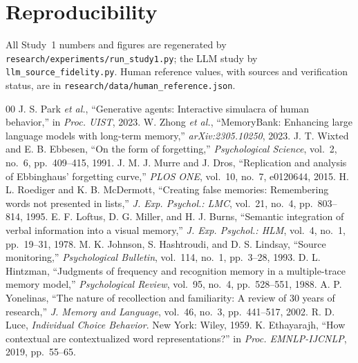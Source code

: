 \documentclass[conference]{IEEEtran}
\begin{document}
\section*{Reproducibility}
All Study~1 numbers and figures are regenerated by
\texttt{research/experiments/run\_study1.py}; the LLM study by
\texttt{llm\_source\_fidelity.py}. Human reference values, with sources and
verification status, are in \texttt{research/data/human\_reference.json}.

\begin{thebibliography}{00}
 J. S. Park \emph{et al.}, ``Generative agents: Interactive
simulacra of human behavior,'' in \emph{Proc. UIST}, 2023.
 W. Zhong \emph{et al.}, ``MemoryBank: Enhancing large language
models with long-term memory,'' \emph{arXiv:2305.10250}, 2023.
 J. T. Wixted and E. B. Ebbesen, ``On the form of forgetting,''
\emph{Psychological Science}, vol.~2, no.~6, pp.~409--415, 1991.
 J. M. J. Murre and J. Dros, ``Replication and analysis of
Ebbinghaus' forgetting curve,'' \emph{PLOS ONE}, vol.~10, no.~7, e0120644, 2015.
 H. L. Roediger and K. B. McDermott, ``Creating false
memories: Remembering words not presented in lists,'' \emph{J. Exp. Psychol.: LMC},
vol.~21, no.~4, pp.~803--814, 1995.
 E. F. Loftus, D. G. Miller, and H. J. Burns, ``Semantic
integration of verbal information into a visual memory,'' \emph{J. Exp. Psychol.:
HLM}, vol.~4, no.~1, pp.~19--31, 1978.
 M. K. Johnson, S. Hashtroudi, and D. S. Lindsay, ``Source
monitoring,'' \emph{Psychological Bulletin}, vol.~114, no.~1, pp.~3--28, 1993.
 D. L. Hintzman, ``Judgments of frequency and recognition
memory in a multiple-trace memory model,'' \emph{Psychological Review}, vol.~95,
no.~4, pp.~528--551, 1988.
 A. P. Yonelinas, ``The nature of recollection and
familiarity: A review of 30 years of research,'' \emph{J. Memory and Language},
vol.~46, no.~3, pp.~441--517, 2002.
 R. D. Luce, \emph{Individual Choice Behavior}. New York: Wiley,
1959.
 K. Ethayarajh, ``How contextual are contextualized word
representations?'' in \emph{Proc. EMNLP-IJCNLP}, 2019, pp.~55--65.
\end{thebibliography}
\end{document}
